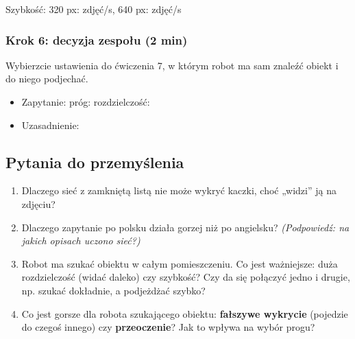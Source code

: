 Szybkość: 320 px:  zdjęć/s, 640 px:  zdjęć/s

\subsubsection{Krok 6: decyzja zespołu (2 min)}\label{krok-6-decyzja-zespoux142u-2-min}

Wybierzcie ustawienia do ćwiczenia 7, w którym robot ma sam znaleźć obiekt i do niego podjechać.

\begin{itemize}
\tightlist
\item
  Zapytanie:  próg:  rozdzielczość: 
\item
  Uzasadnienie: 
\end{itemize}

\subsection{Pytania do przemyślenia}\label{pytania-do-przemyux15blenia}

\begin{enumerate}
\def\labelenumi{\arabic{enumi}.}
\tightlist
\item
  Dlaczego sieć z zamkniętą listą nie może wykryć kaczki, choć „widzi'' ją na zdjęciu?
\item
  Dlaczego zapytanie po polsku działa gorzej niż po angielsku? \emph{(Podpowiedź: na jakich opisach uczono sieć?)}
\item
  Robot ma szukać obiektu w całym pomieszczeniu. Co jest ważniejsze: duża rozdzielczość (widać daleko) czy szybkość? Czy da się połączyć jedno i drugie, np. szukać dokładnie, a podjeżdżać szybko?
\item
  Co jest gorsze dla robota szukającego obiektu: \textbf{fałszywe wykrycie} (pojedzie do czegoś innego) czy \textbf{przeoczenie}? Jak to wpływa na wybór progu?
\end{enumerate}
